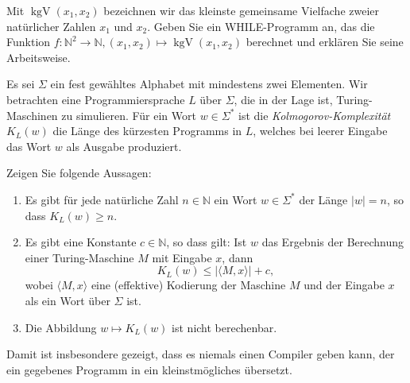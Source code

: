\documentclass[german]{latteachCD}[2017/03/28]
\begin{document}
\begin{exercise}
  Mit $\operatorname{kgV}(x_{1}, x_{2})$ bezeichnen wir das kleinste gemeinsame Vielfache zweier
  natürlicher Zahlen $x_{1}$ und $x_{2}$.
  Geben Sie ein WHILE-Programm an, das die Funktion $f \colon \mathbb N^{2} \to
  \mathbb N, (x_{1}, x_{2}) \mapsto \operatorname{kgV}(x_{1}, x_{2})$
  berechnet und erklären Sie seine Arbeitsweise.
\end{exercise}

\begin{exercise}
  Es sei $\Sigma$ ein fest gewähltes Alphabet mit mindestens zwei Elementen.
  Wir betrachten eine Programmiersprache $L$ über $\Sigma$, die in der Lage ist,
  Turing-Maschinen zu simulieren.  Für ein Wort $w \in \Sigma^{*}$ ist die
  \emph{Kolmogorov-Komplexität} $K_{L}(w)$ die Länge des kürzesten Programms in
  $L$, welches bei leerer Eingabe das Wort $w$ als Ausgabe produziert.

  Zeigen Sie folgende Aussagen:
  \begin{enumerate}
  \item Es gibt für jede natürliche Zahl $n \in \mathbb N$ ein Wort $w \in
    \Sigma^{*}$ der Länge $\lvert w\rvert = n$, so dass $K_{L}(w) \geq n$.
  \item Es gibt eine Konstante $c \in \mathbb N$, so dass gilt: Ist $w$ das
    Ergebnis der Berechnung einer Turing-Maschine $M$ mit Eingabe $x$, dann
    \begin{equation*}
      K_{L}(w) \leq \lvert\langle M,x\rangle\rvert + c,
    \end{equation*}
    wobei $\langle M,x\rangle$ eine (effektive) Kodierung der Maschine $M$ und
    der Eingabe $x$ als ein Wort über $\Sigma$ ist.
  \item Die Abbildung $w \mapsto K_{L}(w)$ ist nicht berechenbar.
  \end{enumerate}

  Damit ist insbesondere gezeigt, dass es niemals einen Compiler geben kann, der
  ein gegebenes Programm in ein kleinstmögliches übersetzt.
\end{exercise}
\end{document}
